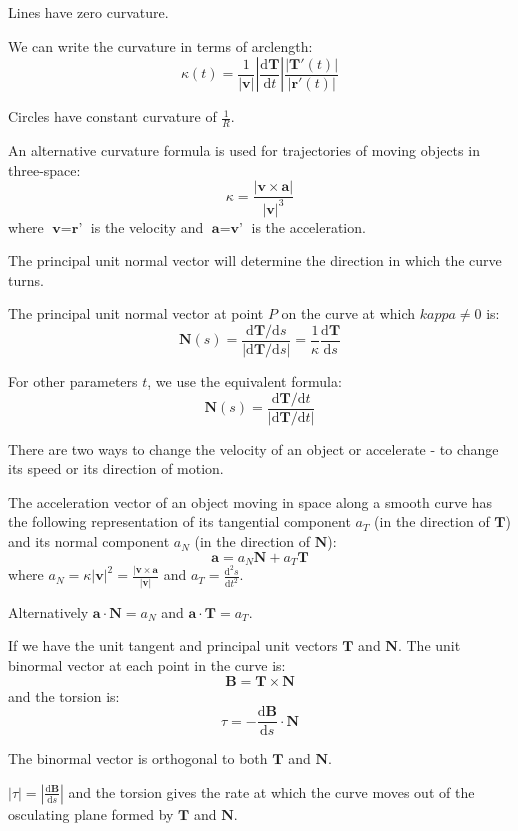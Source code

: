 \documentclass[../calc3.tex]{subfiles}
\begin{document}
Lines have zero curvature.

We can write the curvature in terms of arclength:
\[\kappa(t)=\frac{1}{|\textbf{v}|}\left|\frac{\mathrm{d}\textbf{T}}{\mathrm{d}t}\right|\frac{|\textbf{T}'(t)|}{|\textbf{r}'(t)|}\]

Circles have constant curvature of $\frac{1}{R}$.

An alternative curvature formula is used for trajectories of moving objects in three-space:
\[\kappa = \frac{|\textbf{v}\times\textbf{a}|}{|\textbf{v}|^3}\] 
where $\textbf{v}=\textbf{r'}$ is the velocity and $\textbf{a}=\textbf{v'}$ is the acceleration.

The principal unit normal vector will determine the direction in which the curve turns. 

The principal unit normal vector at point $P$ on the curve at which $kappa\neq 0$ is:
\[\textbf{N}(s)=\frac{\mathrm{d}\textbf{T}/\mathrm{d}s}{|\mathrm{d}\textbf{T}/\mathrm{d}s|}=\frac{1}{\kappa}
\frac{\mathrm{d}\textbf{T}}{\mathrm{d}s}\] 

For other parameters $t$, we use the equivalent formula:
\[\textbf{N}(s)=\frac{\mathrm{d}\textbf{T}/\mathrm{d}t}{|\mathrm{d}\textbf{T}/\mathrm{d}t|}\] 

There are two ways to change the velocity of an object or accelerate - to change its speed or its direction of motion.

The acceleration vector of an object moving in space along a smooth curve has the following representation of its 
tangential component $a_T$ (in the direction of $\textbf{T}$) and its normal component $a_N$ (in the direction of $\textbf{N}$):
\[\textbf{a}=a_N\textbf{N}+a_T\textbf{T}\]
where $a_N=\kappa |\textbf{v}|^2=\frac{|\textbf{v}\times\textbf{a}}{|\textbf{v}|}$ and $a_T=\frac{\mathrm{d}^2s}{\mathrm{d}t^2}$.

Alternatively $\textbf{a}\cdot\textbf{N}=a_N$ and $\textbf{a}\cdot\textbf{T}=a_T$.

If we have the unit tangent and principal unit vectors $\textbf{T}$ and $\textbf{N}$. 
The unit binormal vector at each point in the curve is:
\[ \textbf{B}=\textbf{T}\times\textbf{N}\] 
and the torsion is:
\[\tau = -\frac{\mathrm{d}\textbf{B}}{\mathrm{d}s}\cdot\textbf{N}\]

The binormal vector is orthogonal to both $\textbf{T}$ and $\textbf{N}$.

$|\tau|=\left|\frac{\mathrm{d}\textbf{B}}{\mathrm{d}s}\right|$ and the torsion gives the rate 
at which the curve moves out of the osculating plane formed by $\textbf{T}$ and $\textbf{N}$.
\end{document}
